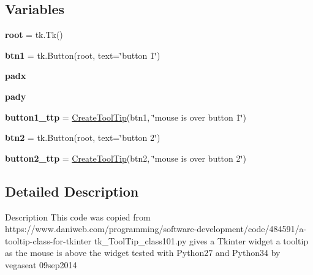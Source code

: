 \subsection*{Variables}
\begin{DoxyCompactItemize}
\item 
{\bfseries root} = tk.\+Tk()\hypertarget{namespacenegui_1_1createtooltip_aa688e3f6b2b59bda1755106900286212}{}\label{namespacenegui_1_1createtooltip_aa688e3f6b2b59bda1755106900286212}

\item 
{\bfseries btn1} = tk.\+Button(root, text=\char`\"{}button 1\char`\"{})\hypertarget{namespacenegui_1_1createtooltip_aa113745f2ab72a5e75ab2bb01cff3356}{}\label{namespacenegui_1_1createtooltip_aa113745f2ab72a5e75ab2bb01cff3356}

\item 
{\bfseries padx}\hypertarget{namespacenegui_1_1createtooltip_a3e804f457c40136bad905e27d85a88a2}{}\label{namespacenegui_1_1createtooltip_a3e804f457c40136bad905e27d85a88a2}

\item 
{\bfseries pady}\hypertarget{namespacenegui_1_1createtooltip_a8eed40e20ac034905e0d509f5492061d}{}\label{namespacenegui_1_1createtooltip_a8eed40e20ac034905e0d509f5492061d}

\item 
{\bfseries button1\+\_\+ttp} = \hyperlink{classnegui_1_1createtooltip_1_1CreateToolTip}{Create\+Tool\+Tip}(btn1, \char`\"{}mouse is over button 1\char`\"{})\hypertarget{namespacenegui_1_1createtooltip_a1262ce17485b05f89c415a9a21aa4b39}{}\label{namespacenegui_1_1createtooltip_a1262ce17485b05f89c415a9a21aa4b39}

\item 
{\bfseries btn2} = tk.\+Button(root, text=\char`\"{}button 2\char`\"{})\hypertarget{namespacenegui_1_1createtooltip_ae134226f2040178666432bcad1ca0a58}{}\label{namespacenegui_1_1createtooltip_ae134226f2040178666432bcad1ca0a58}

\item 
{\bfseries button2\+\_\+ttp} = \hyperlink{classnegui_1_1createtooltip_1_1CreateToolTip}{Create\+Tool\+Tip}(btn2, \char`\"{}mouse is over button 2\char`\"{})\hypertarget{namespacenegui_1_1createtooltip_a4bcc9c17908190cce6b43ad8d0d8a2b1}{}\label{namespacenegui_1_1createtooltip_a4bcc9c17908190cce6b43ad8d0d8a2b1}

\end{DoxyCompactItemize}


\subsection{Detailed Description}
\begin{DoxyVerb}Description
This code was copied from 
https://www.daniweb.com/programming/software-development/code/484591/a-tooltip-class-for-tkinter
tk_ToolTip_class101.py
gives a Tkinter widget a tooltip as the mouse is above the widget
tested with Python27 and Python34  by  vegaseat  09sep2014
\end{DoxyVerb}
 